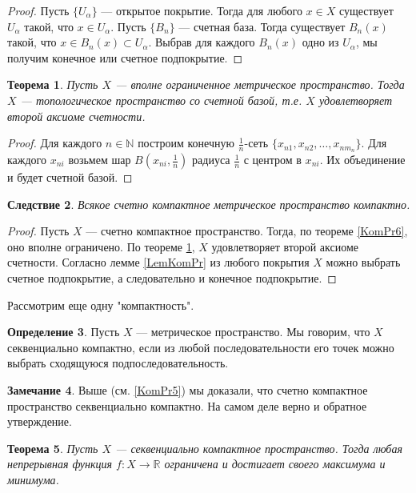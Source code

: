 \documentclass[12pt, titlepage, oneside]{amsbook}
\newcommand{\NN}{\mathbb{N}}
\newcommand{\RR}{\mathbb{R}}
\newtheorem{theorem}{Теорема}[chapter]
\newtheorem{corollary}[theorem]{Следствие}
\theoremstyle{definition}
\newtheorem{definition}[theorem]{Определение}
\newtheorem{remark}[theorem]{Замечание}
\theoremstyle{remark}
\begin{document}
\begin{proof}
	Пусть $\{U_{\alpha}\}$ --- открытое покрытие. Тогда для любого $x\in X$ существует $U_{\alpha}$ такой, что $x\in U_{\alpha}$. Пусть $\{B_n\}$ --- счетная база. Тогда существует $B_n(x)$ такой, что $x\in B_n(x)\subset U_{\alpha}$. Выбрав для каждого $B_n(x)$ одно из $U_{\alpha}$, мы получим конечное или счетное подпокрытие.
\end{proof}

\begin{theorem}
	\label{MetS}
	Пусть $X$ --- вполне ограниченное метрическое пространство. Тогда $X$ --- топологическое пространство со счетной базой, т.е. $X$ удовлетворяет второй аксиоме счетности.
\end{theorem}

\begin{proof}
	Для каждого $n\in\NN$ построим конечную $\frac{1}{n}$-сеть $\{x_{n1},x_{n2},\ldots,x_{nm_n}\}$. Для каждого $x_{ni}$ возьмем шар $B(x_{ni},\frac{1}{n})$ радиуса $\frac{1}{n}$ с центром в $x_{ni}$. Их объединение и будет счетной базой.
\end{proof}

\begin{corollary}
	\label{KomPr7}
	Всякое счетно компактное метрическое пространство компактно.
\end{corollary}

\begin{proof}
	Пусть $X$ --- счетно компактное пространство. Тогда, по теореме \ref{KomPr6}, оно вполне ограничено. По теореме \ref{MetS}, $X$ удовлетворяет второй аксиоме счетности. Согласно лемме \ref{LemKomPr} из любого покрытия $X$ можно выбрать счетное подпокрытие, а следовательно и конечное подпокрытие.
\end{proof}

Рассмотрим еще одну "компактность".

\begin{definition}
	Пусть $X$ --- метрическое пространство. Мы говорим, что $X$ секвенциально компактно, если из любой последовательности его точек можно выбрать сходящуюся подпоследовательность.
\end{definition}

\begin{remark}
	Выше (см. \ref{KomPr5}) мы доказали, что счетно компактное пространство секвенциально компактно. На самом деле верно и обратное утверждение.
\end{remark}

\begin{theorem}
	\label{KomPr8}
	Пусть $X$ --- секвенциально компактное пространство. Тогда любая непрерывная функция $f\colon X\rightarrow\RR$ ограничена и достигает своего максимума и минимума.
\end{theorem}
\end{document}
